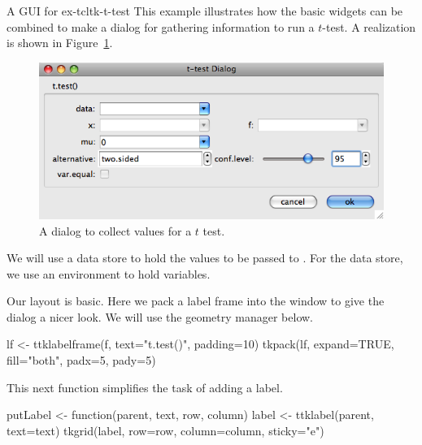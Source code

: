 \begin{example}{A GUI for }{ex-tcltk-t-test}
This example illustrates how the basic widgets can be combined to make
a dialog for gathering information to run a $t$-test. A realization is shown in Figure~\ref{fig:fig-tcltk-t-test}.

\begin{figure}
  \centering
  \includegraphics[width=.75\textwidth]{fig-tcltk-t-test.png}
  \caption{A dialog to collect values for a $t$ test.}
  \label{fig:fig-tcltk-t-test}
\end{figure}





We will use a data store to hold the values to be passed to
. For the data store, we  use an environment to hold \Tcl\/ variables.

\begin{Schunk}
\end{Schunk}



Our layout is basic. Here we pack a label frame into the window to give the dialog a nicer look.
We will use the  geometry manager below.
\begin{Schunk}
\begin{Sinput}
 lf <- ttklabelframe(f, text="t.test()", padding=10)
 tkpack(lf, expand=TRUE, fill="both", padx=5, pady=5)
\end{Sinput}
\end{Schunk}


This next function simplifies the task of adding a label.


\begin{Schunk}
\begin{Sinput}
 putLabel <- function(parent, text, row, column) {
   label <- ttklabel(parent, text=text)
   tkgrid(label, row=row, column=column, sticky="e")
 }
\end{Sinput}
\end{Schunk}


\end{example}
